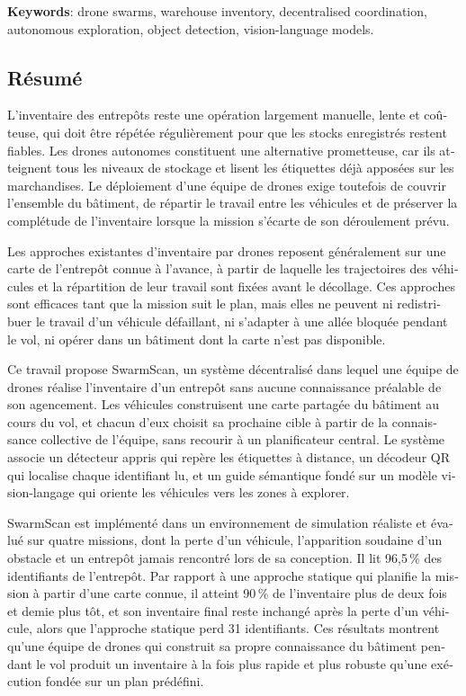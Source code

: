\vspace{1em}
\noindent\textbf{Keywords}: drone swarms, warehouse inventory, decentralised
coordination, autonomous exploration, object detection, vision-language models.

\begin{otherlanguage}{french}
    \chapter*{Résumé}

    L'inventaire des entrepôts reste une opération largement manuelle, lente et
    coûteuse, qui doit être répétée régulièrement pour que les stocks enregistrés
    restent fiables. Les drones autonomes constituent une alternative
    prometteuse, car ils atteignent tous les niveaux de stockage et lisent les
    étiquettes déjà apposées sur les marchandises. Le déploiement d'une équipe de
    drones exige toutefois de couvrir l'ensemble du bâtiment, de répartir le
    travail entre les véhicules et de préserver la complétude de l'inventaire
    lorsque la mission s'écarte de son déroulement prévu.

    Les approches existantes d'inventaire par drones reposent généralement sur
    une carte de l'entrepôt connue à l'avance, à partir de laquelle les
    trajectoires des véhicules et la répartition de leur travail sont fixées
    avant le décollage. Ces approches sont efficaces tant que la mission suit le
    plan, mais elles ne peuvent ni redistribuer le travail d'un véhicule
    défaillant, ni s'adapter à une allée bloquée pendant le vol, ni opérer dans
    un bâtiment dont la carte n'est pas disponible.

    Ce travail propose SwarmScan, un système décentralisé dans lequel une équipe
    de drones réalise l'inventaire d'un entrepôt sans aucune connaissance
    préalable de son agencement. Les véhicules construisent une carte partagée du
    bâtiment au cours du vol, et chacun d'eux choisit sa prochaine cible à partir
    de la connaissance collective de l'équipe, sans recourir à un planificateur
    central. Le système associe un détecteur appris qui repère les étiquettes à
    distance, un décodeur QR qui localise chaque identifiant lu, et un guide
    sémantique fondé sur un modèle vision-langage qui oriente les véhicules vers
    les zones à explorer.

    SwarmScan est implémenté dans un environnement de simulation réaliste et
    évalué sur quatre missions, dont la perte d'un véhicule, l'apparition
    soudaine d'un obstacle et un entrepôt jamais rencontré lors de sa conception.
    Il lit 96,5\,\% des identifiants de l'entrepôt. Par rapport à une approche
    statique qui planifie la mission à partir d'une carte connue, il atteint
    90\,\% de l'inventaire plus de deux fois et demie plus tôt, et son inventaire
    final reste inchangé après la perte d'un véhicule, alors que l'approche
    statique perd 31 identifiants. Ces résultats montrent qu'une équipe de drones
    qui construit sa propre connaissance du bâtiment pendant le vol produit un
    inventaire à la fois plus rapide et plus robuste qu'une exécution fondée sur
    un plan prédéfini.


\end{otherlanguage}
